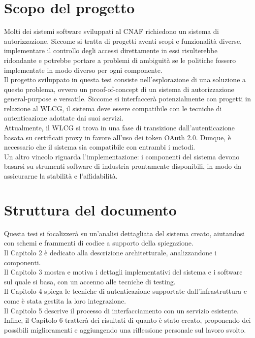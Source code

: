\section{Scopo del progetto}
Molti dei sistemi software sviluppati al CNAF richiedono un sistema di autorizzazione. Siccome si tratta di progetti aventi scopi e funzionalità diverse,
implementare 
il controllo degli accessi direttamente in essi risulterebbe ridondante e potrebbe portare a problemi di ambiguità 
se le politiche fossero implementate in modo diverso per ogni componente.
\\ Il progetto sviluppato in questa tesi consiste nell'esplorazione di una soluzione a questo problema, ovvero un proof-of-concept di 
un sistema di autorizzazione general-purpose e versatile. Siccome si interfaccerà potenzialmente con progetti in relazione al WLCG, 
il sistema deve essere compatibile
 con le tecniche di autenticazione adottate dai suoi servizi.
\\ Attualmente, il WLCG si trova in una fase di transizione dall'autenticazione basata su certificati proxy in favore all'uso dei token OAuth 2.0.
 Dunque, è necessario che il sistema sia compatibile con entrambi i metodi. 
\\Un altro vincolo riguarda l'implementazione: i componenti del sistema devono basarsi su strumenti software di industria prontamente disponibili,
 in modo da assicurarne 
la stabilità e l'affidabilità.  

\section{Struttura del documento}
Questa tesi si focalizzerà su un'analisi dettagliata del sistema creato, aiutandosi con schemi e frammenti 
di codice a supporto della spiegazione.
\\ Il Capitolo 2 è dedicato alla descrizione architetturale, analizzandone i componenti. 
\\ Il Capitolo 3 mostra e motiva i dettagli implementativi del sistema e i software sul quale si basa, con un accenno alle tecniche di testing. 
\\ Il Capitolo 4 spiega le tecniche di autenticazione supportate dall'infrastruttura e come è stata gestita la loro integrazione.  
\\ Il Capitolo 5 descrive il processo di interfacciamento con un servizio esistente. 
\\ Infine, il Capitolo 6 tratterà dei risultati di quanto è stato creato, proponendo 
dei possibili miglioramenti e aggiungendo una riflessione personale sul lavoro svolto. 